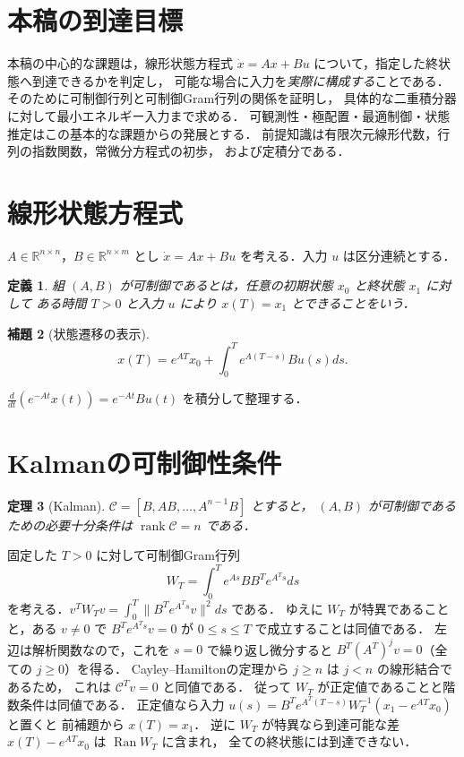\documentclass[a5paper,10pt,onecolumn]{jsarticle}
\makeatletter
\theoremstyle{mathnotetheorem}
\newtheorem{theorem}{定理}[section]
\newtheorem{definition}[theorem]{定義}
\newtheorem{lemma}[theorem]{補題}
\renewcommand{\proofname}{証明}
\renewenvironment{proof}[1][\proofname]{%
  \par\pushQED{\qed}\normalfont\topsep4\p@\@plus2\p@\relax
  \trivlist\item[\hskip\labelsep\bfseries #1]\ignorespaces
}{\popQED\endtrivlist\@endpefalse}
\newcommand{\norm}[1]{\lVert #1\rVert}
\makeatother
\begin{document}
\section*{本稿の到達目標}
本稿の中心的な課題は，線形状態方程式
$\dot x=Ax+Bu$ について，指定した終状態へ到達できるかを判定し，
可能な場合に入力を\emph{実際に構成する}ことである．
そのために可制御行列と可制御Gram行列の関係を証明し，
具体的な二重積分器に対して最小エネルギー入力まで求める．
可観測性・極配置・最適制御・状態推定はこの基本的な課題からの発展とする．
前提知識は有限次元線形代数，行列の指数関数，常微分方程式の初歩，
および定積分である．

\section{線形状態方程式}
$A\in\mathbb R^{n\times n}$，$B\in\mathbb R^{n\times m}$ とし
$\dot x=Ax+Bu$ を考える．入力 $u$ は区分連続とする．
\begin{definition}
組 $(A,B)$ が可制御であるとは，任意の初期状態 $x_0$ と終状態 $x_1$ に対して
ある時間 $T>0$ と入力 $u$ により $x(T)=x_1$ とできることをいう．
\end{definition}
\begin{lemma}[状態遷移の表示]
\[
 x(T)=e^{AT}x_0+\int_0^Te^{A(T-s)}Bu(s)ds.
\]
\end{lemma}
\begin{proof}
$\frac d{dt}(e^{-At}x(t))=e^{-At}Bu(t)$ を積分して整理する．
\end{proof}
\section{Kalmanの可制御性条件}
\begin{theorem}[Kalman]
$\mathcal C=[B,AB,\ldots,A^{n-1}B]$ とすると，
$(A,B)$ が可制御であるための必要十分条件は
$\operatorname{rank}\mathcal C=n$ である．
\end{theorem}
\begin{proof}
固定した $T>0$ に対して可制御Gram行列
\[
 W_T=\int_0^T e^{As}BB^Te^{A^Ts}ds
\]
を考える．$v^TW_Tv=\int_0^T\norm{B^Te^{A^Ts}v}^2ds$ である．
ゆえに $W_T$ が特異であることと，ある $v\ne0$ で
$B^Te^{A^Ts}v=0$ が $0\le s\le T$ で成立することは同値である．
左辺は解析関数なので，これを $s=0$ で繰り返し微分すると
$B^T(A^T)^jv=0$（全ての $j\ge0$）を得る．
Cayley--Hamiltonの定理から $j\ge n$ は $j<n$ の線形結合であるため，
これは $\mathcal C^Tv=0$ と同値である．
従って $W_T$ が正定値であることと階数条件は同値である．
正定値なら入力
$u(s)=B^Te^{A^T(T-s)}W_T^{-1}(x_1-e^{AT}x_0)$ と置くと
前補題から $x(T)=x_1$．
逆に $W_T$ が特異なら到達可能な差
$x(T)-e^{AT}x_0$ は $\operatorname{Ran}W_T$ に含まれ，
全ての終状態には到達できない．
\end{proof}
\end{document}

